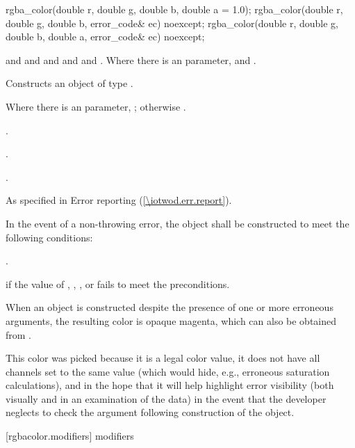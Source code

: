 \begin{itemdecl}
	rgba_color(double r, double g, double b, double a = 1.0);
  	rgba_color(double r, double g, double b, error_code& ec) noexcept;
  	rgba_color(double r, double g, double b, double a, error_code& ec) noexcept;
\end{itemdecl}
\begin{itemdescr}
	\pnum
	\requires
	 and  and  and  and  and . Where there is an  parameter,  and .
	
	\pnum
	\effects
	Constructs an object of type .

	\pnum
	\postconditions
	Where there is an  parameter, ; otherwise .
	
	\pnum
	.
	
	\pnum
	.
	
	\pnum
	.
	
	\pnum
	\throws
	As specified in Error reporting (\ref{\iotwod.err.report}).
	
	\pnum
	\remarks
	In the event of a non-throwing error, the object shall be constructed to meet the following conditions:
	
	\pnum
	.
	
	\pnum
	\errors
	 if the value of , , , or  fails to meet the preconditions.
	
	\pnum
	\realnotes
	When an object is constructed despite the presence of one or more erroneous arguments, the resulting color is opaque magenta, which can also be obtained from .
	
	\pnum
	This color was picked because it is a legal color value, it does not have all channels set to the same value (which would hide, e.g., erroneous saturation calculations), and in the hope that it will help highlight error visibility (both visually and in an examination of the data) in the event that the developer neglects to check the  argument following construction of the object.
\end{itemdescr}

 [rgbacolor.modifiers]{ modifiers}

